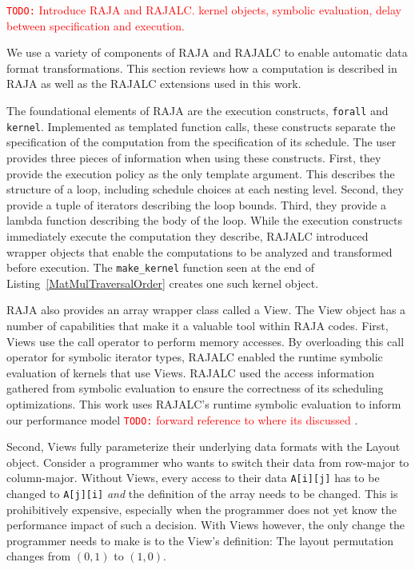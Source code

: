 \documentclass[sigconf, table]{acmart}
\newcommand{\todo}[1]{{\textcolor{red}{{\tt{TODO:}}\,\,#1 }}}
\begin{document}
\todo{Introduce RAJA and RAJALC. kernel objects, symbolic evaluation, delay between specification and execution.}

We use a variety of components of RAJA and RAJALC to enable automatic data format transformations. This section reviews how a computation is described in RAJA as well as the RAJALC extensions used in this work. 

The foundational elements of RAJA are the execution constructs, \verb.forall. and \verb.kernel.. 
Implemented as templated function calls, these constructs separate the specification of the computation from the specification of its schedule. 
The user provides three pieces of information when using these constructs. 
First, they provide the execution policy as the only template argument. 
This describes the structure of a loop, including schedule choices at each nesting level. 
Second, they provide a tuple of iterators describing the loop bounds. 
Third, they provide a lambda function describing the body of the loop.
While the execution constructs immediately execute the computation they describe, RAJALC introduced wrapper objects that enable the computations to be analyzed and transformed before execution. 
The \verb.make_kernel. function seen at the end of Listing~\ref{MatMulTraversalOrder} creates one such kernel object.

RAJA also provides an array wrapper class called a View.
The View object has a number of capabilities that make it a valuable tool within RAJA codes.
First, Views use the call operator to perform memory accesses. 
By overloading this call operator for symbolic iterator types, RAJALC enabled the runtime symbolic evaluation of kernels that use Views.
RAJALC used the access information gathered from symbolic evaluation to ensure the correctness of its scheduling optimizations.
This work uses RAJALC's runtime symbolic evaluation to inform our performance model \todo{forward reference to where its discussed}.

Second, Views fully parameterize their underlying data formats with the Layout object.
Consider a programmer who wants to switch their data from row-major to column-major. 
Without Views, every access to their data \verb.A[i][j]. has to be changed to \verb.A[j][i]. \textit{and} the definition of the array needs to be changed. 
This is prohibitively expensive, especially when the programmer does not yet know the performance impact of such a decision.
With Views however, the only change the programmer needs to make is to the View's definition: The layout permutation changes from $(0,1)$ to $(1,0)$.
\end{document}
